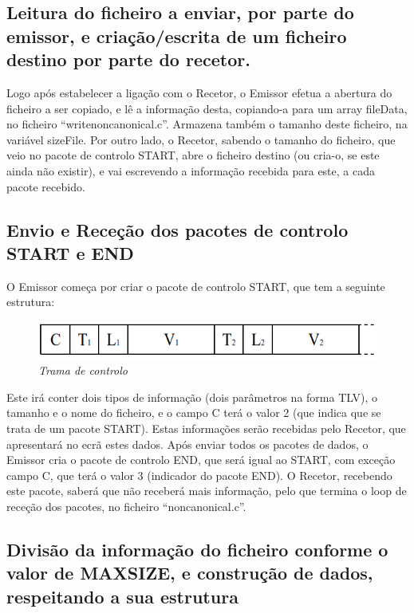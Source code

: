 \documentclass[article, a4paper, 11pt, oneside]{memoir}
\begin{document}
\subsection{Leitura do ficheiro a enviar, por parte do emissor, e criação/escrita de um ficheiro destino por parte do recetor.} 

Logo após estabelecer a ligação com o Recetor, o Emissor efetua a abertura do ficheiro a ser copiado, e lê a informação desta,
copiando-a para um array fileData, no ficheiro “writenoncanonical.c”. Armazena também o 
tamanho deste ficheiro, na variável sizeFile. Por outro lado, o Recetor, sabendo o tamanho 
do ficheiro, que veio no pacote de controlo START, abre o ficheiro destino (ou cria-o, se 
este ainda não existir), e vai escrevendo a informação recebida para este, a cada pacote recebido.

\subsection{Envio e Receção dos pacotes de controlo START e END}
O Emissor começa por criar o pacote de controlo START, que tem a seguinte estrutura:

\begin{figure}[h]
	\centering
\includegraphics[scale=0.4]{trama-2.png}
\caption{\emph{Trama de controlo}}
\end{figure}


Este irá conter dois tipos de informação (dois parâmetros na forma TLV), o tamanho e o nome do ficheiro,
 e o campo C terá o valor 2 (que indica que se trata de um pacote START). 
Estas informações serão recebidas pelo Recetor, que apresentará no ecrã estes dados.
Após enviar todos os pacotes de dados, o Emissor cria o pacote de controlo END, que será igual ao START, com exceção 
 campo C, que terá o valor 3 (indicador do pacote END). 
O Recetor, recebendo este pacote, saberá que não receberá mais informação, pelo que termina o loop de receção dos
 pacotes, no ficheiro “noncanonical.c”.

\subsection{Divisão da informação do ficheiro conforme o valor de MAX\textunderscore SIZE, e construção de dados, respeitando a 
sua estrutura}
\end{document}
